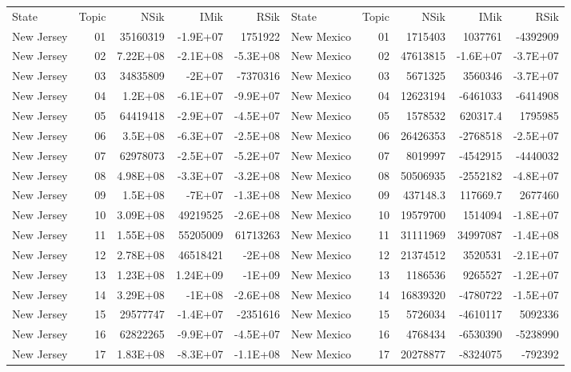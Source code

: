 \begin{table}[]
	\footnotesize
	\begin{tabular}{lrrrrlrrrr}
		State & Topic & NSik & IMik & RSik & State & Topic & NSik & IMik & RSik \\
		New Jersey &  01  & 35160319 & -1.9E+07 & 1751922 & New Mexico &  01  & 1715403 & 1037761 & -4392909 \\
		New Jersey &  02  & 7.22E+08 & -2.1E+08 & -5.3E+08 & New Mexico &  02  & 47613815 & -1.6E+07 & -3.7E+07 \\
		New Jersey &  03  & 34835809 & -2E+07 & -7370316 & New Mexico &  03  & 5671325 & 3560346 & -3.7E+07 \\
		New Jersey &  04  & 1.2E+08 & -6.1E+07 & -9.9E+07 & New Mexico &  04  & 12623194 & -6461033 & -6414908 \\
		New Jersey &  05  & 64419418 & -2.9E+07 & -4.5E+07 & New Mexico &  05  & 1578532 & 620317.4 & 1795985 \\
		New Jersey &  06  & 3.5E+08 & -6.3E+07 & -2.5E+08 & New Mexico &  06  & 26426353 & -2768518 & -2.5E+07 \\
		New Jersey &  07  & 62978073 & -2.5E+07 & -5.2E+07 & New Mexico &  07  & 8019997 & -4542915 & -4440032 \\
		New Jersey &  08  & 4.98E+08 & -3.3E+07 & -3.2E+08 & New Mexico &  08  & 50506935 & -2552182 & -4.8E+07 \\
		New Jersey &  09  & 1.5E+08 & -7E+07 & -1.3E+08 & New Mexico &  09  & 437148.3 & 117669.7 & 2677460 \\
		New Jersey &  10 & 3.09E+08 & 49219525 & -2.6E+08 & New Mexico &  10 & 19579700 & 1514094 & -1.8E+07 \\
		New Jersey &  11 & 1.55E+08 & 55205009 & 61713263 & New Mexico &  11 & 31111969 & 34997087 & -1.4E+08 \\
		New Jersey &  12 & 2.78E+08 & 46518421 & -2E+08 & New Mexico &  12 & 21374512 & 3520531 & -2.1E+07 \\
		New Jersey &  13 & 1.23E+08 & 1.24E+09 & -1E+09 & New Mexico &  13 & 1186536 & 9265527 & -1.2E+07 \\
		New Jersey &  14 & 3.29E+08 & -1E+08 & -2.6E+08 & New Mexico &  14 & 16839320 & -4780722 & -1.5E+07 \\
		New Jersey &  15 & 29577747 & -1.4E+07 & -2351616 & New Mexico &  15 & 5726034 & -4610117 & 5092336 \\
		New Jersey &  16 & 62822265 & -9.9E+07 & -4.5E+07 & New Mexico &  16 & 4768434 & -6530390 & -5238990 \\
		New Jersey &  17 & 1.83E+08 & -8.3E+07 & -1.1E+08 & New Mexico &  17 & 20278877 & -8324075 & -792392 \\

\end{tabular}
\end{table}
